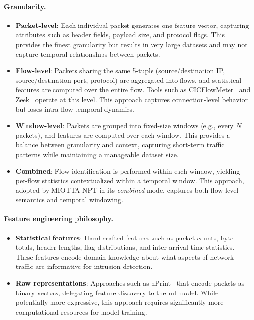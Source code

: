 \paragraph{Granularity.}
\begin{itemize}
    \item \textbf{Packet-level}: Each individual packet generates one feature vector, capturing attributes such as header fields, payload size, and protocol flags. This provides the finest granularity but results in very large datasets and may not capture temporal relationships between packets.

    \item \textbf{Flow-level}: Packets sharing the same 5-tuple (source/destination IP, source/destination port, protocol) are aggregated into flows, and statistical features are computed over the entire flow. Tools such as CICFlowMeter~\cite{cicflowmeter} and Zeek~\cite{zeek} operate at this level. This approach captures connection-level behavior but loses intra-flow temporal dynamics.

    \item \textbf{Window-level}: Packets are grouped into fixed-size windows (e.g., every $N$ packets), and features are computed over each window. This provides a balance between granularity and context, capturing short-term traffic patterns while maintaining a manageable dataset size.

    \item \textbf{Combined}: Flow identification is performed within each window, yielding per-flow statistics contextualized within a temporal window. This approach, adopted by MIOTTA-NPT in its \textit{combined} mode, captures both flow-level semantics and temporal windowing.
\end{itemize}

\paragraph{Feature engineering philosophy.}
\begin{itemize}
    \item \textbf{Statistical features}: Hand-crafted features such as packet counts, byte totals, header lengths, flag distributions, and inter-arrival time statistics. These features encode domain knowledge about what aspects of network traffic are informative for intrusion detection.

    \item \textbf{Raw representations}: Approaches such as nPrint~\cite{holland2021nprint} that encode packets as binary vectors, delegating feature discovery to the \gls{ml} model. While potentially more expressive, this approach requires significantly more computational resources for model training.
\end{itemize}

